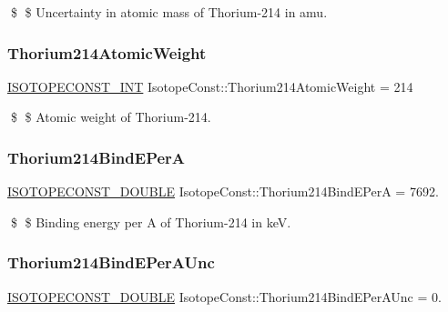 \$ \$ Uncertainty in atomic mass of Thorium-\/214 in amu. \mbox{\label{group___isotope_const-_thorium-_th214_ga1d22ce84d969ea04ee062cc47320cc02}} 
\subsubsection{\texorpdfstring{Thorium214\+Atomic\+Weight}{Thorium214AtomicWeight}}
{\footnotesize\ttfamily \mbox{\hyperlink{group___isotope_const-_macros_ga5f18360b3e99483a35c32d789e62621c}{I\+S\+O\+T\+O\+P\+E\+C\+O\+N\+S\+T\+\_\+\+I\+NT}} Isotope\+Const\+::\+Thorium214\+Atomic\+Weight = 214}

\$ \$ Atomic weight of Thorium-\/214. \mbox{\label{group___isotope_const-_thorium-_th214_ga7e851cc455a6498d052f1ece92f7eec2}} 
\subsubsection{\texorpdfstring{Thorium214\+Bind\+E\+PerA}{Thorium214BindEPerA}}
{\footnotesize\ttfamily \mbox{\hyperlink{group___isotope_const-_macros_ga8f45a7272ce02c0b4c65c44636ed719a}{I\+S\+O\+T\+O\+P\+E\+C\+O\+N\+S\+T\+\_\+\+D\+O\+U\+B\+LE}} Isotope\+Const\+::\+Thorium214\+Bind\+E\+PerA = 7692.}

\$ \$ Binding energy per A of Thorium-\/214 in keV. \mbox{\label{group___isotope_const-_thorium-_th214_ga98147b7ebbd73840b43ad1e661119306}} 
\subsubsection{\texorpdfstring{Thorium214\+Bind\+E\+Per\+A\+Unc}{Thorium214BindEPerAUnc}}
{\footnotesize\ttfamily \mbox{\hyperlink{group___isotope_const-_macros_ga8f45a7272ce02c0b4c65c44636ed719a}{I\+S\+O\+T\+O\+P\+E\+C\+O\+N\+S\+T\+\_\+\+D\+O\+U\+B\+LE}} Isotope\+Const\+::\+Thorium214\+Bind\+E\+Per\+A\+Unc = 0.}

